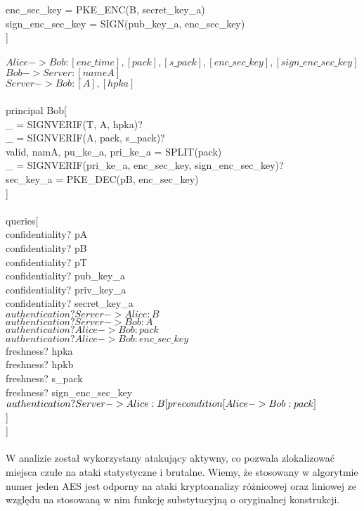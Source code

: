 \documentclass[11pt]{article}
\begin{document}
	enc\_sec\_key = PKE\_ENC(B, secret\_key\_a)\\
	sign\_enc\_sec\_key = SIGN(pub\_key\_a, enc\_sec\_key)\\
]\\\\
$Alice -> Bob: [enc\_time], [pack], [s\_pack], [enc\_sec\_key], [sign\_enc\_sec\_key]$\\
$Bob -> Server: [nameA]$\\
$Server -> Bob: [A], [hpka]$\\\\
principal Bob[\\
	\_ = SIGNVERIF(T, A, hpka)?\\
	\_ = SIGNVERIF(A, pack, s\_pack)?\\
	valid, namA, pu\_ke\_a, pri\_ke\_a = SPLIT(pack)\\
	\_ = SIGNVERIF(pri\_ke\_a, enc\_sec\_key, sign\_enc\_sec\_key)?\\
	sec\_key\_a = PKE\_DEC(pB, enc\_sec\_key)\\
]\\\\
queries[\\
	confidentiality? pA\\
	confidentiality? pB\\
	confidentiality? pT\\
	confidentiality? pub\_key\_a\\
	confidentiality? priv\_key\_a\\
	confidentiality? secret\_key\_a\\
	$authentication? Server -> Alice: B$\\
	$authentication? Server -> Bob: A$\\
	$authentication? Alice -> Bob: pack$\\
	$authentication? Alice -> Bob: enc\_sec\_key$\\
	freshness? hpka\\
	freshness? hpkb\\
	freshness? s\_pack\\
	freshness? sign\_enc\_sec\_key\\
	$authentication? Server -> Alice: B[\\
	precondition[Alice -> Bob: pack]$\\
	]\\
]\\\\
W analizie został wykorzystany atakujący aktywny, co pozwala zlokalizować miejsca czułe na ataki statystyczne i brutalne. Wiemy, że stosowany w algorytmie numer jeden AES jest odporny na ataki kryptoanalizy różnicowej oraz liniowej ze względu na stosowaną w nim funkcję substytucyjną o oryginalnej konstrukcji.
\end{document}
